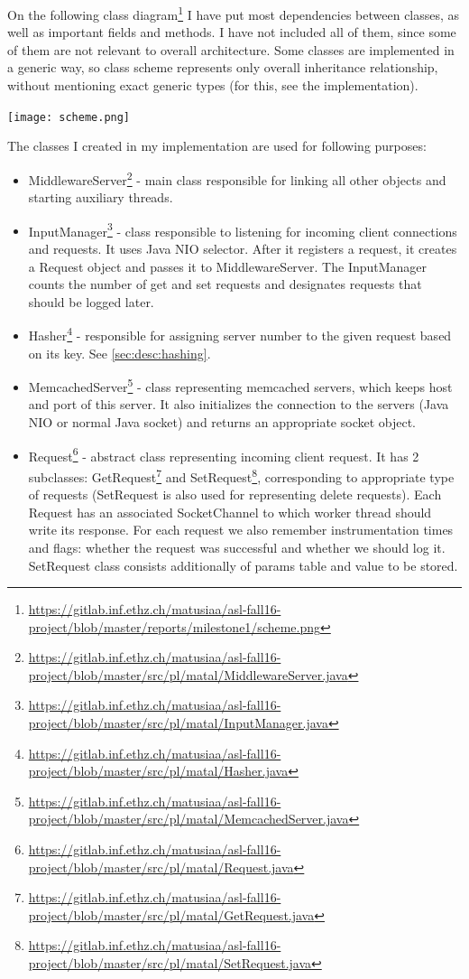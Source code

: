\documentclass[11pt]{article}
\begin{document}
On the following class diagram\footnote{\url{https://gitlab.inf.ethz.ch/matusiaa/asl-fall16-project/blob/master/reports/milestone1/scheme.png}}  I have put most dependencies between classes, as well as important fields and methods. I have not included all of them, since some of them are not relevant to overall architecture. Some classes are implemented in a generic way, so class scheme represents only overall inheritance relationship, without mentioning exact generic types (for this, see the implementation).
\smallskip

\texttt{[image: scheme.png]}
\smallskip

The classes I created in my implementation are used for following purposes:
\begin{itemize}
\item MiddlewareServer\footnote{\url{https://gitlab.inf.ethz.ch/matusiaa/asl-fall16-project/blob/master/src/pl/matal/MiddlewareServer.java}} - main class responsible for linking all other objects and starting auxiliary threads.
\item InputManager\footnote{\url{https://gitlab.inf.ethz.ch/matusiaa/asl-fall16-project/blob/master/src/pl/matal/InputManager.java}} - class responsible to listening for incoming client connections and requests. It uses Java NIO selector. After it registers a request, it creates a Request object and passes it to MiddlewareServer. The InputManager counts the number of get and set requests and designates requests that should be logged later.
\item Hasher\footnote{\url{https://gitlab.inf.ethz.ch/matusiaa/asl-fall16-project/blob/master/src/pl/matal/Hasher.java}} - responsible for assigning server number to the  given request based on its key. See \ref{sec:desc:hashing}.
\item MemcachedServer\footnote{\url{https://gitlab.inf.ethz.ch/matusiaa/asl-fall16-project/blob/master/src/pl/matal/MemcachedServer.java}} - class representing memcached servers, which keeps host and port of this server. It also initializes the connection to the servers (Java NIO or normal Java socket) and returns an appropriate socket object.

\item Request\footnote{\url{https://gitlab.inf.ethz.ch/matusiaa/asl-fall16-project/blob/master/src/pl/matal/Request.java}} - abstract class representing incoming client request. It has 2 subclasses: GetRequest\footnote{\url{https://gitlab.inf.ethz.ch/matusiaa/asl-fall16-project/blob/master/src/pl/matal/GetRequest.java}} and SetRequest\footnote{\url{https://gitlab.inf.ethz.ch/matusiaa/asl-fall16-project/blob/master/src/pl/matal/SetRequest.java}}, corresponding to appropriate type of requests (SetRequest is also used for representing delete requests). Each Request has an associated SocketChannel to which worker thread should write its response. For each request we also remember instrumentation times and flags: whether the request was successful and whether we should log it. SetRequest class consists additionally of params table and value to be stored.


\end{itemize}
\end{document}
